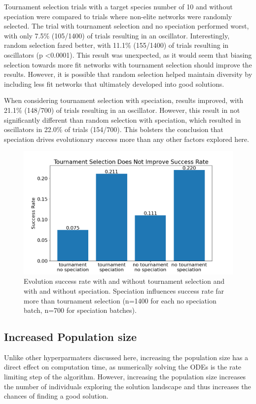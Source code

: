 \documentclass[12pt]{report}
\begin{document}
Tournament selection trials with a target species number of 10 and without speciation were compared to trials where non-elite networks were randomly selected. The trial with tournament selection and no speciation performed worst, with only 7.5\% (105/1400) of trials resulting in an oscillator. Interestingly, random selection fared better, with 11.1\% (155/1400) of trials resulting in oscillators (p \textless 0.0001). This result was unexpected, as it would seem that biasing selection towards more fit networks with tournament selection should improve the results. However, it is possible that random selection helped maintain diversity by including less fit networks that ultimately developed into good solutions.

When considering tournament selection with speciation, results improved, with 21.1\% (148/700) of trials resulting in an oscillator. However, this result in not significantly different than random selection with speciation, which resulted in oscillators in 22.0\% of trials (154/700). This bolsters the conclusion that speciation drives evolutionary success more than any other factors explored here.

\begin{figure}
	\centering
    \includegraphics[width=15cm]{images/tournament_speciation.png}
    \caption[Evolutionary success rates with tournament selection and speciation]{Evolution success rate with and without tournament selection and with and without speciation. Speciation influences success rate far more than tournament selection (n=1400 for each no speciation batch, n=700 for speciation batches).}
    \label{fig:tournament_speciation}
\end{figure}

\subsection{Increased Population size}
Unlike other hyperparmaters discussed here, increasing the population size has a direct effect on computation time, as numerically solving the ODEs is the rate limiting step of the algorithm. However, increasing the population size increases the number of individuals exploring the solution landscape and thus increases the chances of finding a good solution. 
\end{document}
